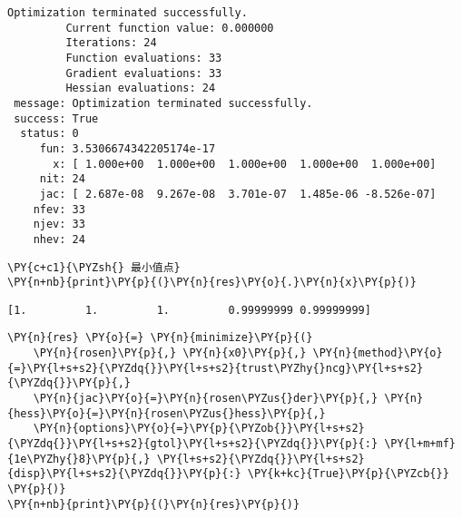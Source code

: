     \begin{Verbatim}[commandchars=\\\{\}]
Optimization terminated successfully.
         Current function value: 0.000000
         Iterations: 24
         Function evaluations: 33
         Gradient evaluations: 33
         Hessian evaluations: 24
 message: Optimization terminated successfully.
 success: True
  status: 0
     fun: 3.5306674342205174e-17
       x: [ 1.000e+00  1.000e+00  1.000e+00  1.000e+00  1.000e+00]
     nit: 24
     jac: [ 2.687e-08  9.267e-08  3.701e-07  1.485e-06 -8.526e-07]
    nfev: 33
    njev: 33
    nhev: 24
    \end{Verbatim}

    \begin{tcolorbox}[breakable, size=fbox, boxrule=1pt, pad at break*=1mm,colback=cellbackground, colframe=cellborder]
\begin{Verbatim}[commandchars=\\\{\}]
\PY{c+c1}{\PYZsh{} 最小值点}
\PY{n+nb}{print}\PY{p}{(}\PY{n}{res}\PY{o}{.}\PY{n}{x}\PY{p}{)}
\end{Verbatim}
\end{tcolorbox}

    \begin{Verbatim}[commandchars=\\\{\}]
[1.         1.         1.         0.99999999 0.99999999]
    \end{Verbatim}

    \begin{tcolorbox}[breakable, size=fbox, boxrule=1pt, pad at break*=1mm,colback=cellbackground, colframe=cellborder]
\begin{Verbatim}[commandchars=\\\{\}]
\PY{n}{res} \PY{o}{=} \PY{n}{minimize}\PY{p}{(}
    \PY{n}{rosen}\PY{p}{,} \PY{n}{x0}\PY{p}{,} \PY{n}{method}\PY{o}{=}\PY{l+s+s2}{\PYZdq{}}\PY{l+s+s2}{trust\PYZhy{}ncg}\PY{l+s+s2}{\PYZdq{}}\PY{p}{,}
    \PY{n}{jac}\PY{o}{=}\PY{n}{rosen\PYZus{}der}\PY{p}{,} \PY{n}{hess}\PY{o}{=}\PY{n}{rosen\PYZus{}hess}\PY{p}{,}
    \PY{n}{options}\PY{o}{=}\PY{p}{\PYZob{}}\PY{l+s+s2}{\PYZdq{}}\PY{l+s+s2}{gtol}\PY{l+s+s2}{\PYZdq{}}\PY{p}{:} \PY{l+m+mf}{1e\PYZhy{}8}\PY{p}{,} \PY{l+s+s2}{\PYZdq{}}\PY{l+s+s2}{disp}\PY{l+s+s2}{\PYZdq{}}\PY{p}{:} \PY{k+kc}{True}\PY{p}{\PYZcb{}}
\PY{p}{)}
\PY{n+nb}{print}\PY{p}{(}\PY{n}{res}\PY{p}{)}
\end{Verbatim}
\end{tcolorbox}


